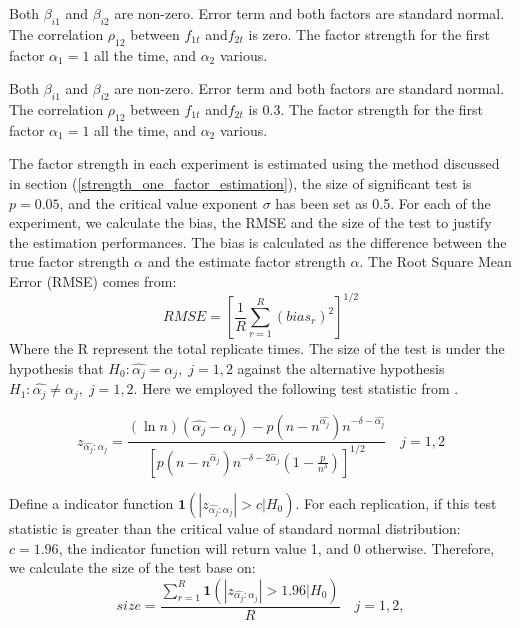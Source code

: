 \begin{experiment}
Both $\beta_{i1}$ and $\beta_{i2}$ are non-zero. Error term and both factors are standard normal. The correlation $\rho_{12}$ between $f_{1t}$ and$f_{2t}$ is zero. 
The factor strength for the first factor $\alpha_1 = 1$ all the time, and $\alpha_2$ various.
\end{experiment}

\begin{experiment}
Both $\beta_{i1}$ and $\beta_{i2}$ are non-zero. Error term  and both factors are standard normal. The correlation $\rho_{12}$ between $f_{1t}$ and$f_{2t}$ is 0.3.
The factor strength for the first factor $\alpha_1 = 1$ all the time, and $\alpha_2$ various.
\end{experiment}

The factor strength in each experiment is estimated using the method discussed in section (\ref{strength_one_factor_estimation}), the size of significant test is $p = 0.05$, and the critical value exponent $\sigma$ has been set as 0.5.
For each of the experiment, we calculate the bias, the RMSE and the size of the test to justify the estimation performances.
The bias is calculated as the difference between the true factor strength $\alpha$ and the estimate factor strength $\hat{\alpha}$.
The Root Square Mean Error (RMSE) comes from:
\[ RMSE =[\frac{1}{R}\sum_{r=1}^{R}(bias_r)^2 ]^{1/2}\]
Where the R represent the total replicate times.
The size of the test is under the hypothesis that $H_0: \hat{\alpha_j} = \alpha_j,\;j =1, 2$ against the alternative hypothesis $H_1:\hat{\alpha_j} \neq \alpha_j,\; j=1,2$.
Here we employed the following test statistic from .

	\[  z_{\hat{\alpha_j}:\alpha_j} =\frac{(\ln n)\left(\hat{\alpha_j}-\alpha_{j}\right)-p\left(n-n^{\hat{\alpha_j}}\right) n^{-\delta-\hat{\alpha_j}}}{\left[p\left(n-n^{\hat{\alpha}_j}\right) n^{-\delta-2 \hat{\alpha}_j}\left(1-\frac{p}{n^{\delta}}\right)\right]^{1 / 2}}\quad j=1,2 \tag{8}  \label{z_indicator}\]

Define a indicator function $\mathbf{1}(|z_{\hat{\alpha_j}:\alpha_j} |>c|H_0)$.
For each replication, if this test statistic is greater than the critical value of standard normal distribution: $c = 1.96$, the indicator function will return value 1, and 0 otherwise.
Therefore, we calculate the size of the test base on:
	\[ size = \frac{\sum_{r=1}^{R} \mathbf{1}(|z_{\hat{\alpha_j}:\alpha_j} |>1.96|H_0)}{R} \quad j =1,2 \tag{9}, \label{size_calculator}\]

